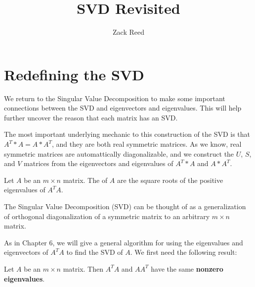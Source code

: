 \documentclass{ximera}
\author{Zack Reed}
\title{SVD Revisited}
\begin{document}
\begin{abstract}

\end{abstract}
\maketitle

\section*{Redefining the SVD}
We return to the Singular Value Decomposition to make some important connections between the SVD and eigenvectors and eigenvalues. This will help further uncover the reason that each matrix has an SVD.

The most important underlying mechanic to this construction of the SVD is that $A^T*A=A*A^T$, and they are both real symmetric matrices. As we know, real symmetric matrices are automattically diagonalizable, and we construct the $U$, $S$, and $V$ matrices from the eigenvectors and eigenvalues of $A^T*A$ and $A*A^T$.
 
\begin{definition}\label{singularvalues}
Let $A$ be an $m\times n$ matrix. The  of $A$ are the square roots of the positive
eigenvalues of $A^TA.$
\end{definition}

The Singular Value Decomposition (SVD) can be thought of as
a generalization of orthogonal diagonalization of a symmetric matrix
to an arbitrary $m\times n$ matrix.

As in Chapter 6, we will give a general algorithm for using the eigenvalues and eigenvectors of $A^TA$ to find the SVD of $A$. We first need the following result:
 
\begin{lemma}\label{lem:samenonzeroeigenvalues}
Let $A$ be an $m \times n$ matrix. Then $A^TA$ and $AA^T$ have the same \textbf{nonzero eigenvalues}.
\end{lemma}
 
 
\end{document}
